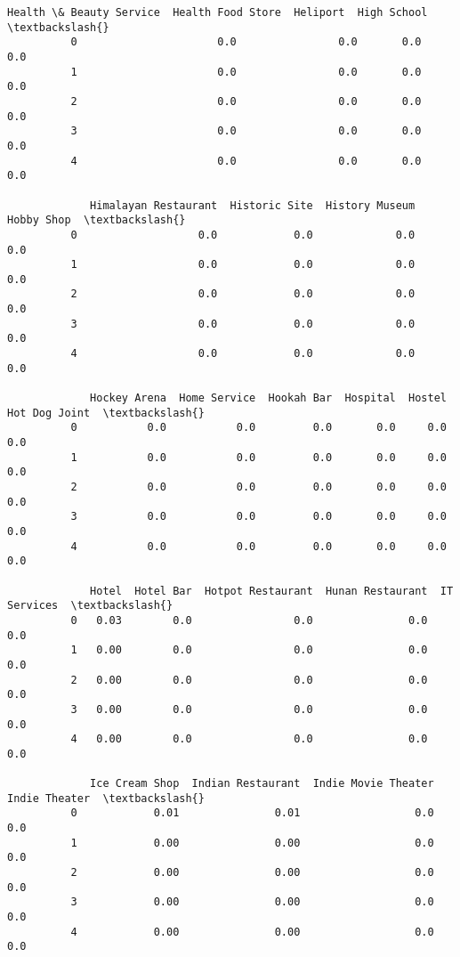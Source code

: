 \documentclass[11pt]{article}
\begin{document}
\begin{Verbatim}[commandchars=\\\{\}]
             Health \& Beauty Service  Health Food Store  Heliport  High School  \textbackslash{}
          0                      0.0                0.0       0.0          0.0   
          1                      0.0                0.0       0.0          0.0   
          2                      0.0                0.0       0.0          0.0   
          3                      0.0                0.0       0.0          0.0   
          4                      0.0                0.0       0.0          0.0   
          
             Himalayan Restaurant  Historic Site  History Museum  Hobby Shop  \textbackslash{}
          0                   0.0            0.0             0.0         0.0   
          1                   0.0            0.0             0.0         0.0   
          2                   0.0            0.0             0.0         0.0   
          3                   0.0            0.0             0.0         0.0   
          4                   0.0            0.0             0.0         0.0   
          
             Hockey Arena  Home Service  Hookah Bar  Hospital  Hostel  Hot Dog Joint  \textbackslash{}
          0           0.0           0.0         0.0       0.0     0.0            0.0   
          1           0.0           0.0         0.0       0.0     0.0            0.0   
          2           0.0           0.0         0.0       0.0     0.0            0.0   
          3           0.0           0.0         0.0       0.0     0.0            0.0   
          4           0.0           0.0         0.0       0.0     0.0            0.0   
          
             Hotel  Hotel Bar  Hotpot Restaurant  Hunan Restaurant  IT Services  \textbackslash{}
          0   0.03        0.0                0.0               0.0          0.0   
          1   0.00        0.0                0.0               0.0          0.0   
          2   0.00        0.0                0.0               0.0          0.0   
          3   0.00        0.0                0.0               0.0          0.0   
          4   0.00        0.0                0.0               0.0          0.0   
          
             Ice Cream Shop  Indian Restaurant  Indie Movie Theater  Indie Theater  \textbackslash{}
          0            0.01               0.01                  0.0            0.0   
          1            0.00               0.00                  0.0            0.0   
          2            0.00               0.00                  0.0            0.0   
          3            0.00               0.00                  0.0            0.0   
          4            0.00               0.00                  0.0            0.0   
          

\end{Verbatim}
\end{document}
